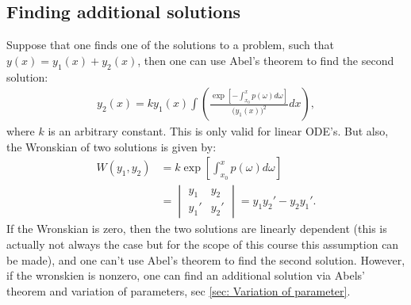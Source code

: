 \documentclass[12pt]{article}
\newcommand{\w}{\omega}
\begin{document}
\subsection{Finding additional solutions}
Suppose that one finds one of the solutions to a problem, such that $y(x) = y_1(x) + y_2(x)$, then one can use Abel's theorem to find the second solution:
\begin{align*}
    y_2(x) = k y_1(x) \int \left(\frac{\exp\left[-\int_{x_0}^x p(\w)d\w\right]}{\big(y_1(x)\big)^2}dx\right),
\end{align*}where $k$ is an arbitrary constant. This is only valid for linear ODE's. But also, the Wronskian of two solutions is given by:
\begin{align*}
    W(y_1,y_2) &= k\exp\left[\int_{x_0}^x p(\w)d\w\right]\\
    &= \begin{vmatrix}
        y_1 & y_2\\
        y_1' & y_2'
    \end{vmatrix} = y_1y_2' - y_2y_1'.
\end{align*}If the Wronskian is zero, then the two solutions are linearly dependent (this is actually not always the case but for the scope of this course this assumption can be made), and one can't use Abel's theorem to find the second solution.
However, if the wronskien is nonzero, one can find an additional solution via Abels' theorem and variation of parameters, sec \ref{sec: Variation of parameter}.
\end{document}
